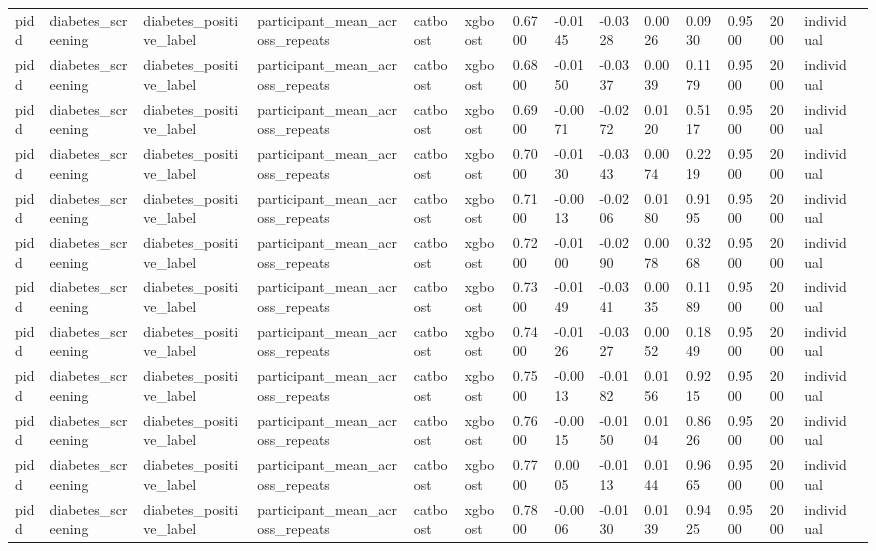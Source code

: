 \begin{tabular}{lllllllllllllll}
pidd & diabetes\_screening & diabetes\_positive\_label & participant\_mean\_across\_repeats & catboost & xgboost & 0.6700 & -0.0145 & -0.0328 & 0.0026 & 0.0930 & 0.9500 & 2000 & individual &  \\
pidd & diabetes\_screening & diabetes\_positive\_label & participant\_mean\_across\_repeats & catboost & xgboost & 0.6800 & -0.0150 & -0.0337 & 0.0039 & 0.1179 & 0.9500 & 2000 & individual &  \\
pidd & diabetes\_screening & diabetes\_positive\_label & participant\_mean\_across\_repeats & catboost & xgboost & 0.6900 & -0.0071 & -0.0272 & 0.0120 & 0.5117 & 0.9500 & 2000 & individual &  \\
pidd & diabetes\_screening & diabetes\_positive\_label & participant\_mean\_across\_repeats & catboost & xgboost & 0.7000 & -0.0130 & -0.0343 & 0.0074 & 0.2219 & 0.9500 & 2000 & individual &  \\
pidd & diabetes\_screening & diabetes\_positive\_label & participant\_mean\_across\_repeats & catboost & xgboost & 0.7100 & -0.0013 & -0.0206 & 0.0180 & 0.9195 & 0.9500 & 2000 & individual &  \\
pidd & diabetes\_screening & diabetes\_positive\_label & participant\_mean\_across\_repeats & catboost & xgboost & 0.7200 & -0.0100 & -0.0290 & 0.0078 & 0.3268 & 0.9500 & 2000 & individual &  \\
pidd & diabetes\_screening & diabetes\_positive\_label & participant\_mean\_across\_repeats & catboost & xgboost & 0.7300 & -0.0149 & -0.0341 & 0.0035 & 0.1189 & 0.9500 & 2000 & individual &  \\
pidd & diabetes\_screening & diabetes\_positive\_label & participant\_mean\_across\_repeats & catboost & xgboost & 0.7400 & -0.0126 & -0.0327 & 0.0052 & 0.1849 & 0.9500 & 2000 & individual &  \\
pidd & diabetes\_screening & diabetes\_positive\_label & participant\_mean\_across\_repeats & catboost & xgboost & 0.7500 & -0.0013 & -0.0182 & 0.0156 & 0.9215 & 0.9500 & 2000 & individual &  \\
pidd & diabetes\_screening & diabetes\_positive\_label & participant\_mean\_across\_repeats & catboost & xgboost & 0.7600 & -0.0015 & -0.0150 & 0.0104 & 0.8626 & 0.9500 & 2000 & individual &  \\
pidd & diabetes\_screening & diabetes\_positive\_label & participant\_mean\_across\_repeats & catboost & xgboost & 0.7700 & 0.0005 & -0.0113 & 0.0144 & 0.9665 & 0.9500 & 2000 & individual &  \\
pidd & diabetes\_screening & diabetes\_positive\_label & participant\_mean\_across\_repeats & catboost & xgboost & 0.7800 & -0.0006 & -0.0130 & 0.0139 & 0.9425 & 0.9500 & 2000 & individual &  \\

\end{tabular}
